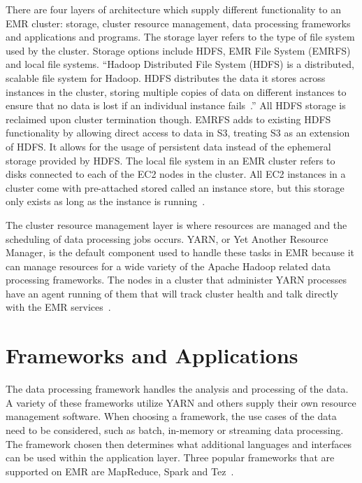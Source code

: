 There are four layers of architecture which supply different functionality to an EMR cluster: storage, cluster resource management, data processing frameworks and applications and programs. The storage layer refers to the type of file system used by the cluster. Storage options include HDFS, EMR File System (EMRFS) and local file systems. ``Hadoop Distributed File System (HDFS) is a distributed, scalable file system for Hadoop. HDFS distributes the data it stores across instances in the cluster, storing multiple copies of data on different instances to ensure that no data is lost if an individual instance fails~\cite{hid-sp18-521-amazonemr-arch}.'' All HDFS storage is reclaimed upon cluster termination though. EMRFS adds to existing HDFS functionality by allowing direct access to data in S3, treating S3 as an extension of HDFS. It allows for the usage of persistent data instead of the ephemeral storage provided by HDFS. The local file system in an EMR cluster refers to disks connected to each of the EC2 nodes in the cluster. All EC2 instances in a cluster come with pre-attached stored called an instance store, but this storage only exists as long as the instance is running~\cite{hid-sp18-521-amazonemr-arch}. 

The cluster resource management layer is where resources are managed and the scheduling of data processing jobs occurs. YARN, or Yet Another Resource Manager, is the default component used to handle these tasks in EMR because it can manage resources for a wide variety of the Apache Hadoop related data processing frameworks. The nodes in a cluster that administer YARN processes have an agent running of them that will track cluster health and talk directly with the EMR services~\cite{hid-sp18-521-amazonemr-arch}. 

\section{Frameworks and Applications}

The data processing framework handles the analysis and processing of the data. A variety of these frameworks utilize YARN and others supply their own resource management software. When choosing a framework, the use cases of the data need to be considered, such as batch, in-memory or streaming data processing. The framework chosen then determines what additional languages and interfaces can be used within the application layer. Three popular frameworks that are supported on EMR are MapReduce, Spark and Tez~\cite{hid-sp18-521-amazonemr-arch}. 

